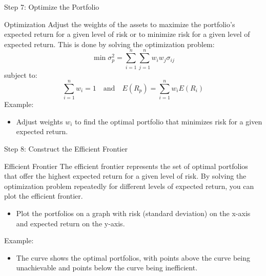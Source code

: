\documentclass{beamer}
\begin{document}
\begin{frame}{Step 7: Optimize the Portfolio}
  \begin{block}{Optimization}
    Adjust the weights of the assets to maximize the portfolio's expected return for a given level of risk or to minimize risk for a given level of expected return. This is done by solving the optimization problem:
    \begin{equation*}
      \min \sigma_p^2 = \sum_{i=1}^{n} \sum_{j=1}^{n} w_i w_j \sigma_{ij}
    \end{equation*}
    subject to:
    \begin{equation*}
      \sum_{i=1}^{n} w_i = 1 \quad \text{and} \quad E(R_p) = \sum_{i=1}^{n} w_i E(R_i)
    \end{equation*}
    Example:
    \begin{itemize}
      \item Adjust weights \(w_i\) to find the optimal portfolio that minimizes risk for a given expected return.
    \end{itemize}
  \end{block}
\end{frame}

\begin{frame}{Step 8: Construct the Efficient Frontier}
  \begin{block}{Efficient Frontier}
    The efficient frontier represents the set of optimal portfolios that offer the highest expected return for a given level of risk. By solving the optimization problem repeatedly for different levels of expected return, you can plot the efficient frontier.
    \begin{itemize}
      \item Plot the portfolios on a graph with risk (standard deviation) on the x-axis and expected return on the y-axis.
    \end{itemize}
    Example:
    \begin{itemize}
      \item The curve shows the optimal portfolios, with points above the curve being unachievable and points below the curve being inefficient.
    \end{itemize}
  \end{block}
\end{frame}
\end{document}
